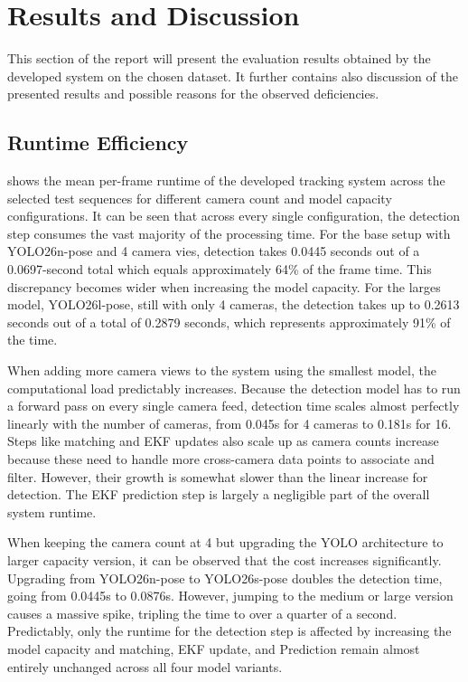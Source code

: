 \section{Results and Discussion} \label{results}

This section of the report will present the evaluation results obtained by the developed system on the chosen dataset. It further contains also discussion of the presented results and possible reasons for the observed deficiencies.

\subsection{Runtime Efficiency} \label{effic}

 shows the mean per-frame runtime of the developed tracking system across the selected test sequences for different camera count and model capacity configurations. It can be seen that across every single configuration, the detection step consumes the vast majority of the processing time. For the base setup with YOLO26n-pose and 4 camera vies, detection takes 0.0445 seconds out of a 0.0697-second total which equals approximately 64\% of the frame time. This discrepancy becomes wider when increasing the model capacity. For the larges model, YOLO26l-pose, still with only 4 cameras, the detection takes up to 0.2613 seconds out of a total of 0.2879 seconds, which represents approximately 91\% of the time.

When adding more camera views to the system using the smallest model, the computational load predictably increases. Because the detection model has to run a forward pass on every single camera feed, detection time scales almost perfectly linearly with the number of cameras, from 0.045s for 4 cameras to 0.181s for 16. Steps like matching and EKF updates also scale up as camera counts increase because these need to handle more cross-camera data points to associate and filter. However, their growth is somewhat slower than the linear increase for detection. The EKF prediction step is largely a negligible part of the overall system runtime.

When keeping the camera count at 4 but upgrading the YOLO architecture to larger capacity version, it can be observed that the cost increases significantly. Upgrading from YOLO26n-pose to YOLO26s-pose doubles the detection time, going from 0.0445s to 0.0876s. However, jumping to the medium or large version causes a massive spike, tripling the time to over a quarter of a second. Predictably, only the runtime for the detection step is affected by increasing the model capacity and matching, EKF update, and Prediction remain almost entirely unchanged across all four model variants.

